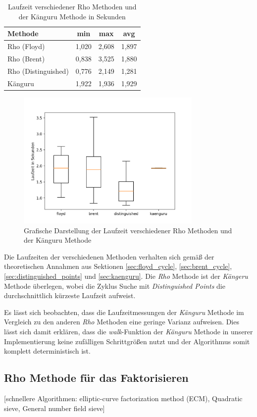 \documentclass{scrartcl}
\begin{document}
\begin{table}[h]
  \centering
  \begin{tabular}{l|c|c|c}
    Methode             & min   & max   & avg   \\ \hline
    Rho (Floyd)         & 1,020 & 2,608 & 1,897  \\ \hline
    Rho (Brent)         & 0,838 & 3,525 & 1,880 \\ \hline
    Rho (Distinguished) & 0,776 & 2,149 & 1,281 \\ \hline
    Känguru             & 1,922 & 1,936 & 1,929
    \end{tabular}
  \caption{Laufzeit verschiedener Rho Methoden und der Känguru Methode in Sekunden}
  \label{tab:benchmark}
\end{table}

\begin{figure}[h]
  \centering
  \includegraphics[width=0.8\textwidth]{../projekt/benchmark/plot.png}
  \caption{Grafische Darstellung der Laufzeit verschiedener Rho Methoden und der Känguru Methode}
  \label{fig:benchmark}
\end{figure}

Die Laufzeiten der verschiedenen Methoden verhalten sich gemäß der
theoretischen Annahmen aus Sektionen \ref{sec:floyd_cycle},
\ref{sec:brent_cycle}, \ref{sec:distinguished_points} und
\ref{sec:kaenguru}.
Die \emph{Rho} Methode ist der \emph{Kängeru} Methode überlegen,
wobei die Zyklus Suche mit \emph{Distinguished Points} die durchschnittlich
kürzeste Laufzeit aufweist.

Es lässt sich beobachten, dass die Laufzeitmessungen der \emph{Känguru}
Methode im Vergleich zu den anderen \emph{Rho} Methoden eine geringe Varianz
aufweisen.
Dies lässt sich damit erklären, dass die \emph{walk}-Funktion der
\emph{Känguru} Methode in unserer Implementierung keine zufälligen
Schrittgrößen nutzt und der Algorithmus somit komplett deterministisch
ist.

\subsection{Rho Methode für das Faktorisieren}
\label{sec:rho_faktorisieren}

[schnellere Algorithmen: elliptic-curve factorization method (ECM), Quadratic sieve, General number field sieve]

\cite{Pollard1975}

\newpage
\printbibliography[heading=bibintoc]
\end{document}
